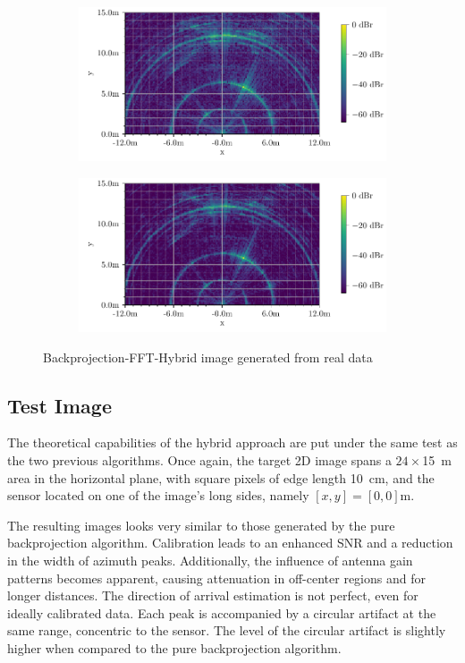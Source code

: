 \begin{figure}[b]
    \centering
    \begin{subfigure}{0.8\textwidth}
        \includegraphics[width=\textwidth]{../figures/testimg_uncalibrated_hybrid.pdf}
    \end{subfigure}
    \begin{subfigure}{0.8\textwidth}
        \includegraphics[width=\textwidth]{../figures/testimg_calibrated_hybrid.pdf}
    \end{subfigure}
    \caption{Backprojection-FFT-Hybrid image generated from real data}
    \label{fig:hybrid_testimg}
\end{figure}
\subsection{Test Image}
The theoretical capabilities of the hybrid approach are put under the same test as the two previous algorithms.
Once again, the target 2D image spans a $24 \times$\SI{15}{\m} area in the horizontal plane,
with square pixels of edge length \SI{10}{\cm},
and the sensor located on one of the image's long sides, namely $[x,y] = [0,0]$m.

The resulting images looks very similar to those generated by the pure backprojection algorithm.
Calibration leads to an enhanced SNR and a reduction in the width of azimuth peaks.
Additionally, the influence of antenna gain patterns becomes apparent,
causing attenuation in off-center regions and for longer distances.
The direction of arrival estimation is not perfect, even for ideally calibrated data.
Each peak is accompanied by a circular artifact at the same range, concentric to the sensor.
The level of the circular artifact is slightly higher when compared to the pure backprojection algorithm.



